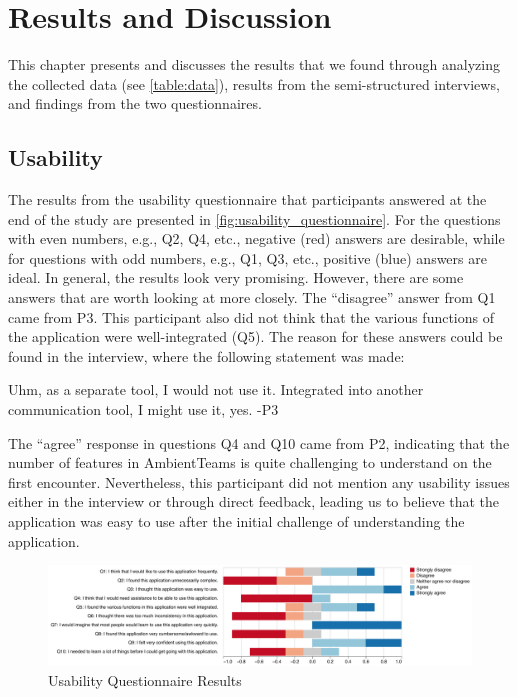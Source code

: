 \chapter{Results and Discussion}
\label{chapter:results_and_discussion}

This chapter presents and discusses the results that we found through analyzing the collected data (see \autoref{table:data}), results from the semi-structured interviews, and findings from the two questionnaires.

\section{Usability}
\label{section:usability}

The results from the usability questionnaire that participants answered at the end of the study are presented in \autoref{fig:usability_questionnaire}. For the questions with even numbers, e.g., Q2, Q4, etc., negative (red) answers are desirable, while for questions with odd numbers, e.g., Q1, Q3, etc., positive (blue) answers are ideal. In general, the results look very promising. However, there are some answers that are worth looking at more closely. The \enquote{disagree} answer from Q1 came from P3. This participant also did not think that the various functions of the application were well-integrated (Q5). The reason for these answers could be found in the interview, where the following statement was made:

\begin{displayquote}
    Uhm, as a separate tool, I would not use it. Integrated into another communication tool, I might use it, yes. -P3
\end{displayquote}

The \enquote{agree} response in questions Q4 and Q10 came from P2, indicating that the number of features in AmbientTeams is quite challenging to understand on the first encounter. Nevertheless, this participant did not mention any usability issues either in the interview or through direct feedback, leading us to believe that the application was easy to use after the initial challenge of understanding the application.

\begin{figure}[h]
    \centering
    \includegraphics[width=\linewidth]{plots/usability_likert.pdf}
    \caption{Usability Questionnaire Results}
    \label{fig:usability_questionnaire}
\end{figure}

